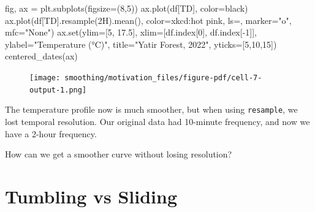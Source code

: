 \documentclass[
  letterpaper,
  DIV=11,
  numbers=noendperiod,
  oneside]{scrreprt}
\newenvironment{Shaded}{\begin{snugshade}}{\end{snugshade}}
\newcommand{\BuiltInTok}[1]{\textcolor[rgb]{0.00,0.23,0.31}{#1}}
\newcommand{\DecValTok}[1]{\textcolor[rgb]{0.68,0.00,0.00}{#1}}
\newcommand{\FloatTok}[1]{\textcolor[rgb]{0.68,0.00,0.00}{#1}}
\newcommand{\NormalTok}[1]{\textcolor[rgb]{0.00,0.23,0.31}{#1}}
\newcommand{\OperatorTok}[1]{\textcolor[rgb]{0.37,0.37,0.37}{#1}}
\newcommand{\StringTok}[1]{\textcolor[rgb]{0.13,0.47,0.30}{#1}}
\begin{document}
\begin{Shaded}
\begin{Highlighting}[]
\NormalTok{fig, ax }\OperatorTok{=}\NormalTok{ plt.subplots(figsize}\OperatorTok{=}\NormalTok{(}\DecValTok{8}\NormalTok{,}\DecValTok{5}\NormalTok{))}
\NormalTok{ax.plot(df[}\StringTok{\textquotesingle{}TD\textquotesingle{}}\NormalTok{], color}\OperatorTok{=}\StringTok{\textquotesingle{}black\textquotesingle{}}\NormalTok{)}
\NormalTok{ax.plot(df[}\StringTok{\textquotesingle{}TD\textquotesingle{}}\NormalTok{].resample(}\StringTok{\textquotesingle{}2H\textquotesingle{}}\NormalTok{).mean(),}
\NormalTok{        color}\OperatorTok{=}\StringTok{\textquotesingle{}xkcd:hot pink\textquotesingle{}}\NormalTok{, ls}\OperatorTok{=}\StringTok{\textquotesingle{}{-}\textquotesingle{}}\NormalTok{,}
\NormalTok{        marker}\OperatorTok{=}\StringTok{"o"}\NormalTok{, mfc}\OperatorTok{=}\StringTok{"None"}\NormalTok{)}
\NormalTok{ax.}\BuiltInTok{set}\NormalTok{(ylim}\OperatorTok{=}\NormalTok{[}\DecValTok{5}\NormalTok{, }\FloatTok{17.5}\NormalTok{],}
\NormalTok{       xlim}\OperatorTok{=}\NormalTok{[df.index[}\DecValTok{0}\NormalTok{], df.index[}\OperatorTok{{-}}\DecValTok{1}\NormalTok{]],}
\NormalTok{       ylabel}\OperatorTok{=}\StringTok{"Temperature (°C)"}\NormalTok{,}
\NormalTok{       title}\OperatorTok{=}\StringTok{"Yatir Forest, 2022"}\NormalTok{,}
\NormalTok{       yticks}\OperatorTok{=}\NormalTok{[}\DecValTok{5}\NormalTok{,}\DecValTok{10}\NormalTok{,}\DecValTok{15}\NormalTok{])}
\NormalTok{centered\_dates(ax)}
\end{Highlighting}
\end{Shaded}

\begin{figure}[H]

{\centering \texttt{[image: smoothing/motivation\_files/figure-pdf/cell-7-output-1.png]}

}

\end{figure}

The temperature profile now is much smoother, but when using
\texttt{resample}, we lost temporal resolution. Our original data had
10-minute frequency, and now we have a 2-hour frequency.

How can we get a smoother curve without losing resolution?

\hypertarget{tumbling-vs-sliding}{%
\section{Tumbling vs Sliding}\label{tumbling-vs-sliding}}
\end{document}
